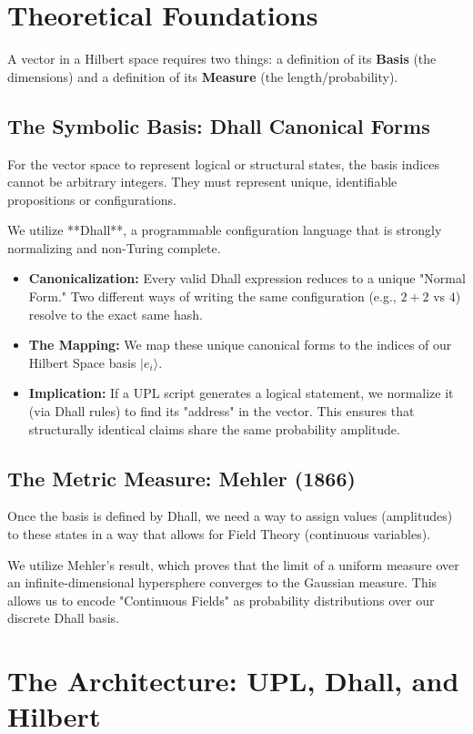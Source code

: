 \documentclass{stex}
\begin{document}
\section{Theoretical Foundations}

A vector in a Hilbert space requires two things: a definition of its \textbf{Basis} (the dimensions) and a definition of its \textbf{Measure} (the length/probability).

\subsection{The Symbolic Basis: Dhall Canonical Forms}
For the vector space to represent logical or structural states, the basis indices cannot be arbitrary integers. They must represent unique, identifiable propositions or configurations.

We utilize **Dhall**, a programmable configuration language that is strongly normalizing and non-Turing complete.
\begin{itemize}
    \item \textbf{Canonicalization:} Every valid Dhall expression reduces to a unique "Normal Form." Two different ways of writing the same configuration (e.g., $2+2$ vs $4$) resolve to the exact same hash.
    \item \textbf{The Mapping:} We map these unique canonical forms to the indices of our Hilbert Space basis $|e_i\rangle$.
    \item \textbf{Implication:} If a UPL script generates a logical statement, we normalize it (via Dhall rules) to find its "address" in the vector. This ensures that structurally identical claims share the same probability amplitude.
\end{itemize}

\subsection{The Metric Measure: Mehler (1866)}
Once the basis is defined by Dhall, we need a way to assign values (amplitudes) to these states in a way that allows for Field Theory (continuous variables).

We utilize Mehler's result, which proves that the limit of a uniform measure over an infinite-dimensional hypersphere converges to the Gaussian measure. This allows us to encode "Continuous Fields" as probability distributions over our discrete Dhall basis.

\section{The Architecture: UPL, Dhall, and Hilbert}
\end{document}
